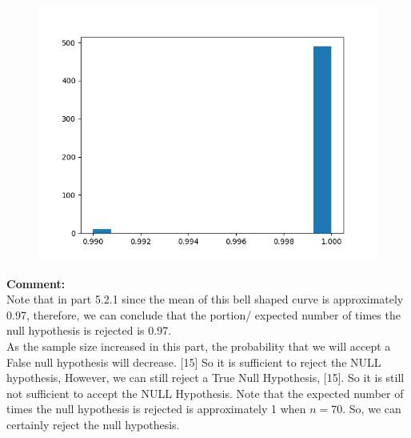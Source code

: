 \documentclass[answers]{exam}
\begin{document}
\begin{framed}
\begin{figure}[H] %
    \centering
    \includegraphics[width= 0.5 \textwidth]{Q5.2.2_histogram.png}
\end{figure}
\textbf{Comment:}\\
Note that in part 5.2.1 since the mean of this bell shaped curve is approximately 0.97, therefore, we can conclude that the portion/ expected number of times the null hypothesis is rejected is 0.97. \\
As the sample size increased in this part, the probability that we will accept a False null hypothesis will decrease. 
[15] So it is sufficient to reject the NULL hypothesis, However, we can still reject a True Null Hypothesis, [15]. So it is still not sufficient to accept the NULL Hypothesis. Note that the expected number of times the null hypothesis is rejected is approximately 1 when $n = 70$. So, we can certainly reject the null hypothesis. \\
\end{framed}

\end{document}
